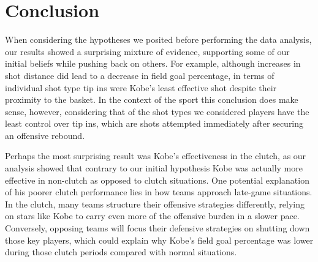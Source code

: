 \documentclass[paper=a4, fontsize=11pt]{scrartcl} %
\numberwithin{equation}{section} %
\numberwithin{figure}{section} %
\numberwithin{table}{section} %
\begin{document}
\section{Conclusion}
\hspace*{1cm}When considering the hypotheses we posited before performing the data analysis, our results showed a surprising mixture of evidence, supporting some of our initial beliefs while pushing back on others. For example, although increases in shot distance did lead to a decrease in field goal percentage, in terms of individual shot type tip ins were Kobe's least effective shot despite their proximity to the basket. In the context of the sport this conclusion does make sense, however, considering that of the shot types we considered players have the least control over tip ins, which are shots attempted immediately after securing an offensive rebound. 

\hspace*{1cm}Perhaps the most surprising result was Kobe's effectiveness in the clutch, as our analysis showed that contrary to our initial hypothesis Kobe was actually more effective in non-clutch as opposed to clutch situations. One potential explanation of his poorer clutch performance lies in how teams approach late-game situations. In the clutch, many teams structure their offensive strategies differently, relying on stars like Kobe to carry even more of the offensive burden in a slower pace. Conversely, opposing teams will focus their defensive strategies on shutting down those key players, which could explain why Kobe's field goal percentage was lower during those clutch periods compared with normal situations. 
\end{document}
